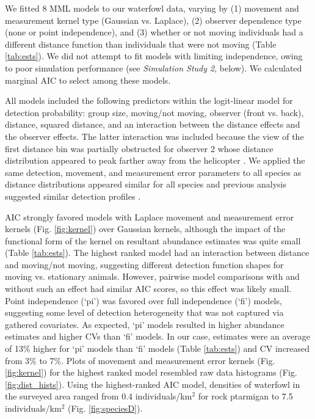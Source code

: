 \documentclass[aoas,preprint]{imsart}
\numberwithin{equation}{section}
\theoremstyle{plain}
\begin{document}
We fitted 8 MML models to our waterfowl data, varying by (1) movement and measurement kernel type (Gaussian vs. Laplace), (2) observer dependence type (none or point independence), and (3) whether or not moving individuals had a different distance function than individuals that were not moving (Table \ref{tab:ests}).  We did not attempt to fit models with limiting independence, owing to poor simulation performance (see \textit{Simulation Study 2}, below). We calculated marginal AIC to select among these models.

All models included the following predictors within the logit-linear model for detection probability: group size, moving/not moving, observer (front vs. back), distance, squared distance, and an interaction between the distance effects and the observer effects.  The latter interaction was included because the view of the first distance bin was partially obstructed for observer 2 whose distance distribution appeared to peak farther away from the helicopter \citep[see][]{AlisauskasConn2017}.  We applied the same detection, movement, and measurement error parameters to all species as distance distributions appeared similar for all species and previous analysis suggested similar detection profiles \citep{AlisauskasConn2017}.

AIC strongly favored models with Laplace movement and measurement error kernels (Fig. \ref{fig:kernel}) over Gaussian kernels, although the impact of the functional form of the kernel on resultant abundance estimates was quite small (Table \ref{tab:ests}).  The highest ranked model had an interaction between distance and moving/not moving, suggesting different detection function shapes for moving vs. stationary animals. However, pairwise model comparisons with and without such an effect had similar AIC scores, so this effect was likely small. Point independence (`pi') was favored over full independence (`fi') models, suggesting some level of detection heterogeneity that was not captured via gathered covariates.  As expected, `pi' models resulted in higher abundance estimates and higher CVs than `fi' models. In our case, estimates were an average of 13\% higher for `pi' models than `fi' models (Table \ref{tab:ests}) and CV increased from 3\% to 7\%.  Plots of movement and measurement error kernels (Fig. \ref{fig:kernel}) for the highest ranked model resembled raw data histograms (Fig. \ref{fig:dist_hists}).  Using the highest-ranked AIC model, densities of waterfowl in the surveyed area ranged from 0.4 individuals/km$^2$ for rock ptarmigan to 7.5 individuals/km$^2$ (Fig. \ref{fig:speciesD}).
\end{document}
